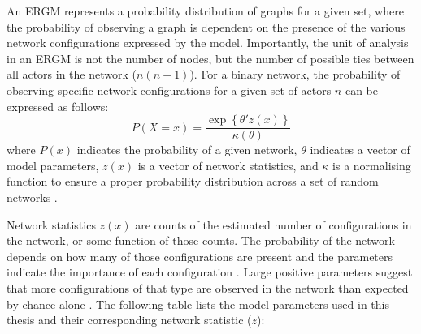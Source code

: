 \onehalfspacing
An ERGM represents a probability distribution of graphs for a given set, where the probability of observing a graph is dependent on the presence of the various network configurations expressed by the model. Importantly, the unit of analysis in an ERGM is not the number of nodes, but the number of possible ties between all actors in the network ($n(n-1)$). For a binary network, the probability of observing specific network configurations for a given set of actors \(n\) can be expressed as follows: $$ P(X = x) = \frac{\exp \left \{ \theta'z(x)  \right \}}{\kappa (\theta )} $$ where $P(x)$ indicates the probability of a given network, $\theta$ indicates a vector of model parameters, $z(x)$ is a vector of network statistics, and $\kappa$ is a normalising function to ensure a proper probability distribution across a set of random networks \citep{shumate2010exponential}. \medskip 

Network statistics $z(x)$ are counts of the estimated number of configurations in the network, or some function of those counts. The probability of the network depends on how many of those configurations are present and the parameters indicate the importance of each configuration \citep{lusher2013exponential}. Large positive parameters suggest that more configurations of that type are observed in the network than expected by chance alone \citep{robins2009closure}. The following table lists the model parameters used in this thesis and their corresponding network statistic ($z$): \medskip

